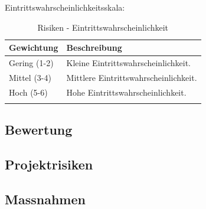 Eintrittswahrscheinlichkeitsskala:

\begin{longtable}[]{@{}lp{10cm}@{}}
  \toprule
  \textbf{Gewichtung} & \textbf{Beschreibung}\tabularnewline
  \midrule
  \endhead
  Gering (1-2) & Kleine Eintrittswahrscheinlichkeit.\tabularnewline
  Mittel (3-4) & Mittlere Eintrittswahrscheinlichkeit.\tabularnewline
  Hoch (5-6) & Hohe Eintrittswahrscheinlichkeit.\tabularnewline
  \bottomrule
  \caption{Risiken - Eintrittswahrscheinlichkeit}
\end{longtable}

\subsection{Bewertung}\label{risikenbewertung}

\subsection{Projektrisiken}\label{projektrisiken}

\subsection{Massnahmen}\label{massnahmen}
